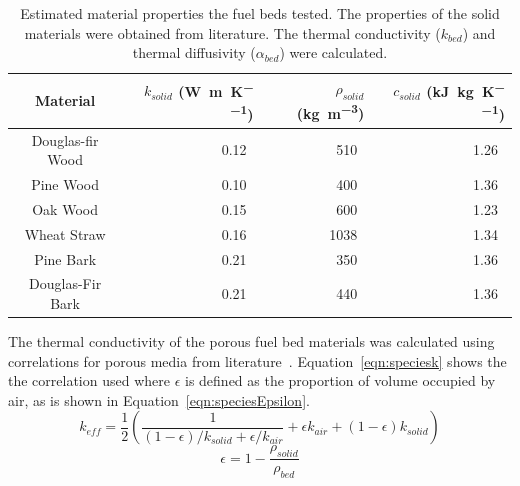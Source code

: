     \begin{table}[hpbt]
        \caption{Estimated material properties the fuel beds tested. The properties of the solid materials were obtained from literature. The thermal conductivity ($k_{bed}$) and thermal diffusivity ($\alpha_{bed}$) were calculated.}
        \centering
        \begin{tabular}{crrr}
            Material &
            $k_{solid}$ (\si{\watt\per\meter\per\kelvin})&
            $\rho_{solid}$ (\si{\kilo\gram\per\cubic\meter}) &
            $c_{solid}$ (\si{\kilo\joule\per\kilogram\per\kelvin})\\
            \hline
            Douglas-fir Wood & 0.12~\cite{Laboratory2010} & 510~\cite{Bean2021}  & 1.26~\cite{Laboratory2010}\\
            Pine Wood        & 0.10~\cite{Laboratory2010} & 400~\cite{Miles2009} & 1.36~\cite{Laboratory2010}\\
            Oak Wood         & 0.15~\cite{Laboratory2010} & 600~\cite{Miles2009} & 1.23~\cite{Laboratory2010}\\
            Wheat Straw      & 0.16~\cite{Mason2016}      & 1038~\cite{Lam2007}  & 1.34~\cite{Stenseng2001}  \\
            Pine Bark        & 0.21~\cite{Gupta2003}      & 350~\cite{Miles2009} & 1.36~\cite{Gupta2003}     \\
            Douglas-Fir Bark & 0.21~\cite{Gupta2003}      & 440~\cite{Miles2009} & 1.36~\cite{Gupta2003}     
        \end{tabular}
        \label{tab:solidProperties}
    \end{table}
    The thermal conductivity of the porous fuel bed materials was calculated using correlations for porous media from literature~\cite{bergman2011fundamentals}. Equation~\ref{eqn:speciesk} shows the the correlation used where $\epsilon$ is defined as the proportion of volume occupied by air, as is shown in Equation~\ref{eqn:speciesEpsilon}.
            \begin{equation}
            k_{eff} = \frac{1}{2} \left(\frac{1}{\left( 1 - \epsilon \right)/k_{solid} + \epsilon/k_{air}} +  \epsilon k_{air} + \left(1-\epsilon \right) k_{solid} \right)
            \label{eqn:speciesk}
        \end{equation}
        \begin{equation}
            \epsilon = 1- \frac{\rho_{solid}}{\rho_{bed}}
            \label{eqn:speciesEpsilon}
        \end{equation}

